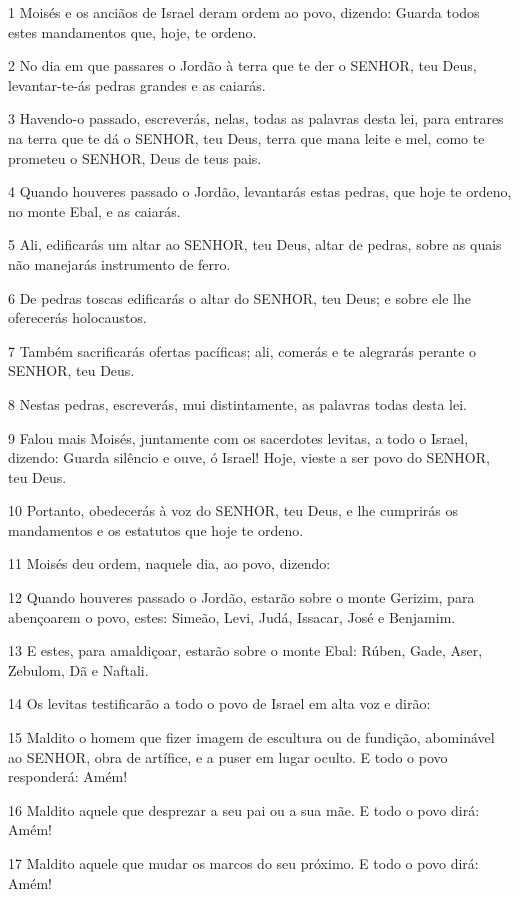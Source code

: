 \par 1 Moisés e os anciãos de Israel deram ordem ao povo, dizendo: Guarda todos estes mandamentos que, hoje, te ordeno.
\par 2 No dia em que passares o Jordão à terra que te der o SENHOR, teu Deus, levantar-te-ás pedras grandes e as caiarás.
\par 3 Havendo-o passado, escreverás, nelas, todas as palavras desta lei, para entrares na terra que te dá o SENHOR, teu Deus, terra que mana leite e mel, como te prometeu o SENHOR, Deus de teus pais.
\par 4 Quando houveres passado o Jordão, levantarás estas pedras, que hoje te ordeno, no monte Ebal, e as caiarás.
\par 5 Ali, edificarás um altar ao SENHOR, teu Deus, altar de pedras, sobre as quais não manejarás instrumento de ferro.
\par 6 De pedras toscas edificarás o altar do SENHOR, teu Deus; e sobre ele lhe oferecerás holocaustos.
\par 7 Também sacrificarás ofertas pacíficas; ali, comerás e te alegrarás perante o SENHOR, teu Deus.
\par 8 Nestas pedras, escreverás, mui distintamente, as palavras todas desta lei.
\par 9 Falou mais Moisés, juntamente com os sacerdotes levitas, a todo o Israel, dizendo: Guarda silêncio e ouve, ó Israel! Hoje, vieste a ser povo do SENHOR, teu Deus.
\par 10 Portanto, obedecerás à voz do SENHOR, teu Deus, e lhe cumprirás os mandamentos e os estatutos que hoje te ordeno.
\par 11 Moisés deu ordem, naquele dia, ao povo, dizendo:
\par 12 Quando houveres passado o Jordão, estarão sobre o monte Gerizim, para abençoarem o povo, estes: Simeão, Levi, Judá, Issacar, José e Benjamim.
\par 13 E estes, para amaldiçoar, estarão sobre o monte Ebal: Rúben, Gade, Aser, Zebulom, Dã e Naftali.
\par 14 Os levitas testificarão a todo o povo de Israel em alta voz e dirão:
\par 15 Maldito o homem que fizer imagem de escultura ou de fundição, abominável ao SENHOR, obra de artífice, e a puser em lugar oculto. E todo o povo responderá: Amém!
\par 16 Maldito aquele que desprezar a seu pai ou a sua mãe. E todo o povo dirá: Amém!
\par 17 Maldito aquele que mudar os marcos do seu próximo. E todo o povo dirá: Amém!

